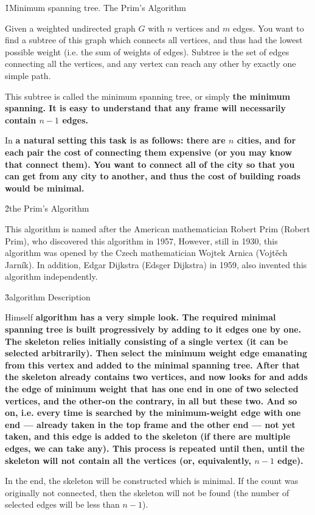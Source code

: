 \h1{Minimum spanning tree. The Prim's Algorithm}

Given a weighted undirected graph $G$ with $n$ vertices and $m$ edges. You want to find a subtree of this graph which connects all vertices, and thus had the lowest possible weight (i.e. the sum of weights of edges). Subtree is the set of edges connecting all the vertices, and any vertex can reach any other by exactly one simple path.

This subtree is called the minimum spanning tree, or simply \bf{the minimum spanning}. It is easy to understand that any frame will necessarily contain $n-1$ edges.

In \bf{a natural setting} this task is as follows: there are $n$ cities, and for each pair the cost of connecting them expensive (or you may know that connect them). You want to connect all of the city so that you can get from any city to another, and thus the cost of building roads would be minimal.


\h2{the Prim's Algorithm}

This algorithm is named after the American mathematician Robert Prim (Robert Prim), who discovered this algorithm in 1957, However, still in 1930, this algorithm was opened by the Czech mathematician Wojtek Arnica (Vojtěch Jarník). In addition, Edgar Dijkstra (Edsger Dijkstra) in 1959, also invented this algorithm independently.


\h3{algorithm Description}

Himself \bf{algorithm} has a very simple look. The required minimal spanning tree is built progressively by adding to it edges one by one. The skeleton relies initially consisting of a single vertex (it can be selected arbitrarily). Then select the minimum weight edge emanating from this vertex and added to the minimal spanning tree. After that the skeleton already contains two vertices, and now looks for and adds the edge of minimum weight that has one end in one of two selected vertices, and the other-on the contrary, in all but these two. And so on, i.e. every time is searched by the minimum-weight edge with one end --- already taken in the top frame and the other end --- not yet taken, and this edge is added to the skeleton (if there are multiple edges, we can take any). This process is repeated until then, until the skeleton will not contain all the vertices (or, equivalently, $n-1$ edge).

In the end, the skeleton will be constructed which is minimal. If the count was originally not connected, then the skeleton will not be found (the number of selected edges will be less than $n-1$).


